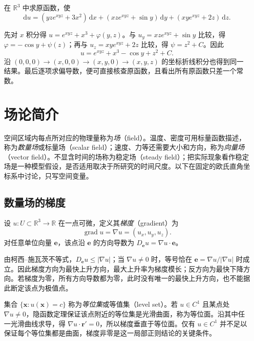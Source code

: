 \begin{example}
\label{ex:potential-exponential-polynomial}
在 $\mathbb R^3$ 中求原函数，使
\[
    \mathrm du=(yze^{xyz}+3x^2)\,\mathrm dx
      +(xze^{xyz}+\sin y)\,\mathrm dy
      +(xye^{xyz}+2z)\,\mathrm dz.
\]
\end{example}
\begin{solve}
先对 $x$ 积分得 $u=e^{xyz}+x^3+\varphi(y,z)$。与 $u_y=xze^{xyz}+\sin y$ 比较，得 $\varphi=-\cos y+\psi(z)$；再与 $u_z=xye^{xyz}+2z$ 比较，得 $\psi=z^2+C$。因此
\[
    u=e^{xyz}+x^3-\cos y+z^2+C.
\]
沿 $(0,0,0)\to(x,0,0)\to(x,y,0)\to(x,y,z)$ 的坐标折线积分也得到同一结果。最后逐项求偏导数，便可直接核查原函数，且看出所有原函数只差一个常数。
\end{solve}

\section{场论简介}
\label{sec:introduction-to-field-theory}

空间区域内每点所对应的物理量称为\emph{场}（field）。温度、密度可用标量函数描述，称为\emph{数量场}或标量场（scalar field）；速度、力等还需要大小和方向，称为\emph{向量场}（vector field）。不显含时间的场称为稳定场（steady field）；把实际现象看作稳定场是一种模型假设，是否适用取决于所研究的时间尺度。以下在固定的欧氏直角坐标系中讨论，只写空间变量。

\subsection{数量场的梯度}
\label{subsec:gradient-of-scalar-fields}

\begin{definition}
\label{def:scalar-field-gradient}
设 $u:U\subset\mathbb R^3\to\mathbb R$ 在一点可微，定义其\emph{梯度}（gradient）为
\[
    \operatorname{grad}u=\nabla u=(u_x,u_y,u_z).
\]
对任意单位向量 $\boldsymbol e$，该点沿 $\boldsymbol e$ 的方向导数为 $D_{\boldsymbol e}u=\nabla u\cdot\boldsymbol e$。
\end{definition}

由柯西--施瓦茨不等式，$D_{\boldsymbol e}u\leq|\nabla u|$；当 $\nabla u\neq0$ 时，等号恰在 $\boldsymbol e=\nabla u/|\nabla u|$ 时成立。因此梯度方向为最快上升方向，最大上升率为梯度模长；反方向为最快下降方向。若梯度为零，所有方向导数都为零，此时没有唯一的最快上升方向，也不能据此断定该点为极值点。

集合 $\{\boldsymbol x:u(\boldsymbol x)=c\}$ 称为\emph{等位集}或等值集（level set）。若 $u\in C^1$ 且某点处 $\nabla u\neq0$，隐函数定理保证该点附近的等位集是光滑曲面，称为等位面。沿其中任一光滑曲线求导，得 $\nabla u\cdot\boldsymbol r'=0$，所以梯度垂直于等位面。仅有 $u\in C^1$ 并不足以保证每个等位集都是曲面，梯度非零是这一局部正则结论的关键条件。


